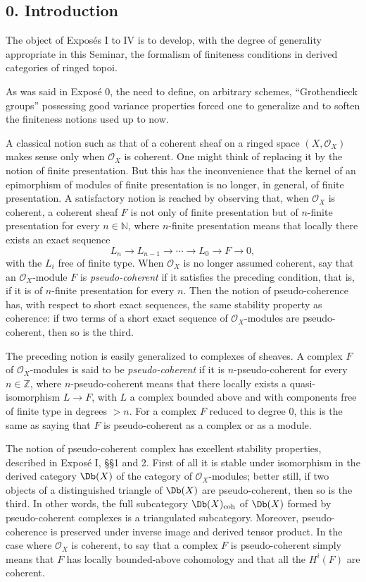\subsection*{0. Introduction}
The object of Exposés I to IV is to develop, with the degree of generality appropriate in this Seminar, the formalism of finiteness conditions in derived categories of ringed topoi.

As was said in Exposé 0, the need to define, on arbitrary schemes, ``Grothendieck groups'' possessing good variance properties forced one to generalize and to soften the finiteness notions used up to now.

A classical notion such as that of a coherent sheaf on a ringed space \((X,\mathcal O_X)\) makes sense only when \(\mathcal O_X\) is coherent. One might think of replacing it by the notion of finite presentation. But this has the inconvenience that the kernel of an epimorphism of modules of finite presentation is no longer, in general, of finite presentation. A satisfactory notion is reached by observing that, when \(\mathcal O_X\) is coherent, a coherent sheaf \(F\) is not only of finite presentation but of \(n\)-finite presentation for every \(n\in\mathbb N\), where \(n\)-finite presentation means that locally there exists an exact sequence
\[
  L_n\longrightarrow L_{n-1}\longrightarrow \cdots \longrightarrow L_0\longrightarrow F\longrightarrow 0,
\]
with the \(L_i\) free of finite type. When \(\mathcal O_X\) is no longer assumed coherent, say that an \(\mathcal O_X\)-module \(F\) is \emph{pseudo-coherent} if it satisfies the preceding condition, that is, if it is of \(n\)-finite presentation for every \(n\). Then the notion of pseudo-coherence has, with respect to short exact sequences, the same stability property as coherence: if two terms of a short exact sequence of \(\mathcal O_X\)-modules are pseudo-coherent, then so is the third.

The preceding notion is easily generalized to complexes of sheaves. A complex \(F\) of \(\mathcal O_X\)-modules is said to be \emph{pseudo-coherent} if it is \(n\)-pseudo-coherent for every \(n\in\mathbb Z\), where \(n\)-pseudo-coherent means that there locally exists a quasi-isomorphism \(L\to F\), with \(L\) a complex bounded above and with components free of finite type in degrees \(>n\). For a complex \(F\) reduced to degree \(0\), this is the same as saying that \(F\) is pseudo-coherent as a complex or as a module.

The notion of pseudo-coherent complex has excellent stability properties, described in Exposé I, §§1 and 2. First of all it is stable under isomorphism in the derived category \(\Db(X)\) of the category of \(\mathcal O_X\)-modules; better still, if two objects of a distinguished triangle of \(\Db(X)\) are pseudo-coherent, then so is the third. In other words, the full subcategory \(\Db(X)_{\mathrm{coh}}\) of \(\Db(X)\) formed by pseudo-coherent complexes is a triangulated subcategory. Moreover, pseudo-coherence is preserved under inverse image and derived tensor product. In the case where \(\mathcal O_X\) is coherent, to say that a complex \(F\) is pseudo-coherent simply means that \(F\) has locally bounded-above cohomology and that all the \(H^i(F)\) are coherent.

